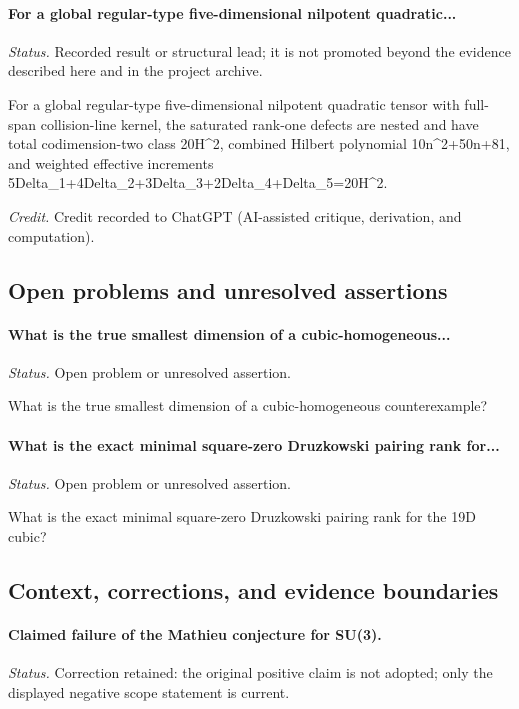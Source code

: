 \label{supp-note-05-035}
\paragraph{For a global regular-type five-dimensional nilpotent quadratic...}
\emph{Status.} Recorded result or structural lead; it is not promoted beyond the evidence described here and in the project archive.

For a global regular-type five-dimensional nilpotent quadratic tensor with full-span collision-line kernel, the saturated rank-one defects are nested and have total codimension-two class 20H\textasciicircum{}2, combined Hilbert polynomial 10n\textasciicircum{}2+50n+81, and weighted effective increments 5Delta\_1+4Delta\_2+3Delta\_3+2Delta\_4+Delta\_5=20H\textasciicircum{}2.

\emph{Credit.} Credit recorded to ChatGPT (AI-assisted critique, derivation, and computation).

\subsection{Open problems and unresolved assertions}

\label{supp-note-05-036}
\paragraph{What is the true smallest dimension of a cubic-homogeneous...}
\emph{Status.} Open problem or unresolved assertion.

What is the true smallest dimension of a cubic-homogeneous counterexample?

\label{supp-note-05-037}
\paragraph{What is the exact minimal square-zero Druzkowski pairing rank for...}
\emph{Status.} Open problem or unresolved assertion.

What is the exact minimal square-zero Druzkowski pairing rank for the 19D cubic?

\subsection{Context, corrections, and evidence boundaries}

\label{supp-note-05-038}
\paragraph{Claimed failure of the Mathieu conjecture for SU(3).}
\emph{Status.} Correction retained: the original positive claim is not adopted; only the displayed negative scope statement is current.

